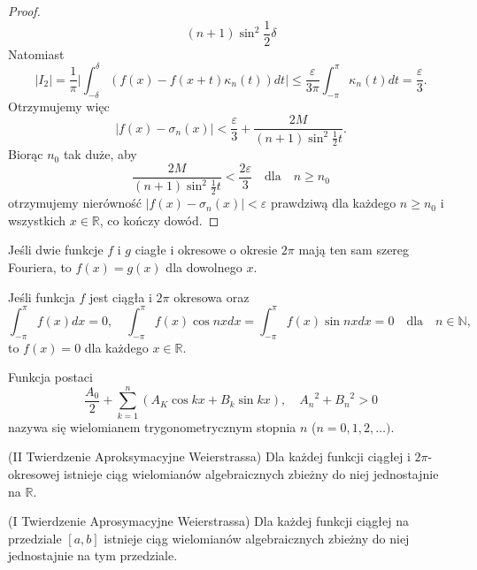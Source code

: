 \documentclass[leqno]{article}
\begin{document}
\begin{justify}
\begin{proof}
\[        {(n+1)\sin^2\frac{1}{2}\delta}
    \]
    Natomiast
    \[
        |I_2| = \frac{1}{\pi}\Bigg| \int_{-\delta}^{\delta}(f(x) - f(x+t)\kappa_n(t))dt \Bigg| 
        \leqslant \frac{\varepsilon}{3\pi}\int_{-\pi}^{\pi}\kappa_n(t)dt = \frac{\varepsilon}
        {3}.
    \]
    Otrzymujemy więc
    \[
        |f(x) - \sigma_n(x)| < \frac{\varepsilon}{3} + \frac{2M}{(n+1)\sin^2\frac{1}{2}t}.
    \]
    Biorąc $n_0$ tak duże, aby
    \[
        \frac{2M}{(n+1)\sin^2\frac{1}{2}t} < \frac{2\varepsilon}{3} \quad \text{dla} \quad n 
        \geqslant n_0
    \]
    otrzymujemy nierówność $|f(x) - \sigma_n(x)| < \varepsilon$ prawdziwą dla każdego $n 
    \geqslant n_0$ i wszystkich $x \in \mathbb{R}$, co kończy dowód.
\end{proof}

\begin{wniosek}
{
    Jeśli dwie funkcje $f$ i $g$ ciagłe i okresowe o okresie $2\pi$ mają ten sam szereg 
    Fouriera, to $f(x) = g(x)$ dla dowolnego $x$.
}
\end{wniosek}

\begin{wniosek}
{
    Jeśli funkcja $f$ jest ciągła i $2\pi$ okresowa oraz
    \[
        \int_{-\pi}^{\pi}f(x)dx = 0, \quad \int_{-\pi}^{\pi}f(x)\cos nx dx = \int_{-\pi}^{\pi}f(x)\sin nx dx = 0 \quad \text{dla} \quad n \in \mathbb{N},
    \]
    to $f(x) = 0$ dla każdego $x \in \mathbb{R}$.
}
\end{wniosek}

\begin{defn}
    Funkcja postaci
    \[
        \frac{A_0}{2} + \sum_{k=1}^{n}(A_K \cos kx + B_k \sin kx), \quad {A_n}^2 + {B_n}^2 > 0
    \]
    nazywa się wielomianem trygonometrycznym stopnia $n$ ($n = 0, 1, 2, \ldots)$.
\end{defn}

\begin{wniosek}
{
    (II Twierdzenie Aproksymacyjne Weierstrassa) Dla każdej funkcji ciągłej i $2\pi$-okresowej 
    istnieje ciąg wielomianów algebraicznych zbieżny do niej jednostajnie na $\mathbb{R}$.
}
\end{wniosek}

\begin{wniosek}
{
    (I Twierdzenie Aprosymacyjne Weierstrassa) Dla każdej funkcji ciągłej na przedziale $[a,b]
    $ istnieje ciąg wielomianów algebraicznych zbieżny do niej jednostajnie na tym przedziale.
}
\end{wniosek}


\end{justify}
\end{document}
